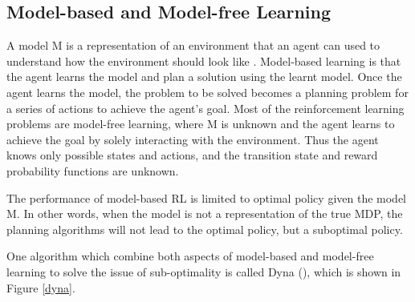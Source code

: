 \documentclass[12pt,twoside]{report}
\DeclareMathOperator{\E}{\mathbb{E}}
\begin{document}


%
%
%
%

\subsection{Model-based and Model-free Learning}
\label{model_base_model_free_subsection}
A model M is a representation of an environment that an agent can used to understand how the environment should look like . Model-based learning is that the agent learns the model and plan a solution using the learnt model. Once the agent learns the model, the problem to be solved becomes a planning problem for a series of actions to achieve the agent's goal.
Most of the reinforcement learning problems are model-free learning, where M is unknown and the agent learns to achieve the goal by solely interacting with the environment. Thus the agent knows only possible states and actions, and the transition state and reward probability functions are unknown.

The performance of model-based RL is limited to optimal policy given the model M. In other words, when the model is not a representation of the true MDP, the planning algorithms will not lead to the optimal policy, but a suboptimal policy.

One algorithm which combine both aspects of model-based and model-free learning to solve the issue of sub-optimality is called Dyna (\cite{Sutton1990}), which is shown in Figure \ref{dyna}.
\end{document}
